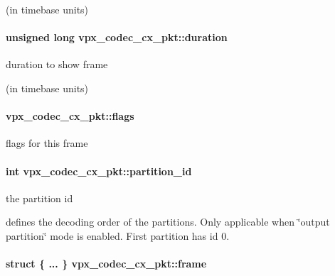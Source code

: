  (in timebase units) \hypertarget{structvpx__codec__cx__pkt_afb8d9069980e759d97d2eb9fae7e5e06}{
\paragraph[{duration}]{\setlength{\rightskip}{0pt plus 5cm}unsigned long vpx\-\_\-codec\-\_\-cx\-\_\-pkt\-::duration}}\label{structvpx__codec__cx__pkt_afb8d9069980e759d97d2eb9fae7e5e06}
\begin{DoxyVerb}     duration to show frame
\end{DoxyVerb}
 (in timebase units) \hypertarget{structvpx__codec__cx__pkt_a3876fe0306342611465e9c15c6c4ae2f}{
\paragraph[{flags}]{ vpx\-\_\-codec\-\_\-cx\-\_\-pkt\-::flags}}\label{structvpx__codec__cx__pkt_a3876fe0306342611465e9c15c6c4ae2f}
flags for this frame \hypertarget{structvpx__codec__cx__pkt_aaffee6af93af238ca7a145fb56c6d6f7}{
\paragraph[{partition\-\_\-id}]{\setlength{\rightskip}{0pt plus 5cm}int vpx\-\_\-codec\-\_\-cx\-\_\-pkt\-::partition\-\_\-id}}\label{structvpx__codec__cx__pkt_aaffee6af93af238ca7a145fb56c6d6f7}
\begin{DoxyVerb}               the partition id
\end{DoxyVerb}
 defines the decoding order of the partitions. Only applicable when \char`\"{}output partition\char`\"{} mode is enabled. First partition has id 0. \hypertarget{structvpx__codec__cx__pkt_a81e33bf4408a3983abb16492fee359ff}{
\paragraph[{frame}]{\setlength{\rightskip}{0pt plus 5cm}struct \{ ... \}   vpx\-\_\-codec\-\_\-cx\-\_\-pkt\-::frame}}\label{structvpx__codec__cx__pkt_a81e33bf4408a3983abb16492fee359ff}
